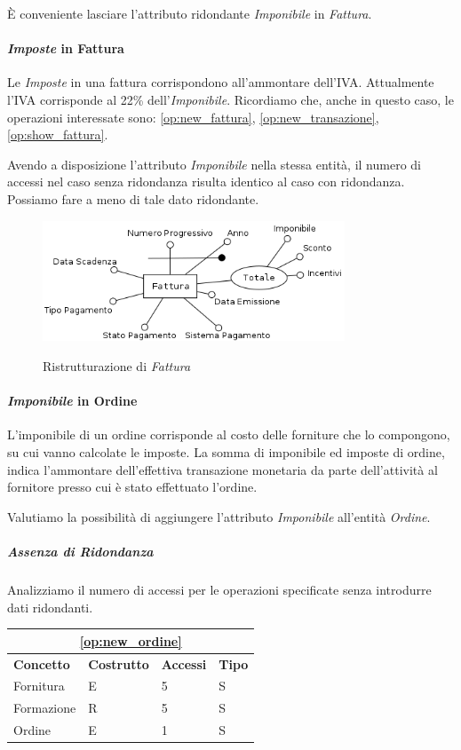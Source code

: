 					È conveniente lasciare l'attributo ridondante \emph{Imponibile} in \emph{Fattura}.

			\paragraph{\emph{Imposte} in Fattura}
				Le \emph{Imposte} in una fattura corrispondono all'ammontare dell'IVA. Attualmente l'IVA corrisponde al 22\% dell'\emph{Imponibile}. Ricordiamo che, anche in questo caso, le operazioni interessate sono: \ref{op:new_fattura}, \ref{op:new_transazione}, \ref{op:show_fattura}.

				Avendo a disposizione l'attributo \emph{Imponibile} nella stessa entità, il numero di accessi nel caso senza ridondanza risulta identico al caso con ridondanza. Possiamo fare a meno di tale dato ridondante.

				\begin{figure}[H]
					\includegraphics[width=9cm]{images/refactor/fattura.png}
					\centering
					\label{fig:fattura_refactor}
					\caption{Ristrutturazione di \emph{Fattura}}
				\end{figure}

			\paragraph{\emph{Imponibile} in Ordine}
				L'imponibile di un ordine corrisponde al costo delle forniture che lo compongono, su cui vanno calcolate le imposte. La somma di imponibile ed imposte di ordine, indica l'ammontare dell'effettiva transazione monetaria da parte dell'attività al fornitore presso cui è stato effettuato l'ordine.

				Valutiamo la possibilità di aggiungere l'attributo \emph{Imponibile} all'entità \emph{Ordine}.

				\subparagraph{Assenza di Ridondanza}
					Analizziamo il numero di accessi per le operazioni specificate senza introdurre dati ridondanti.

					\vspace{2ex}
					\begin{tabular}{| p{3cm} | p{3cm} | p{3cm} | p{3cm} |}
						\hline
						\multicolumn{4}{|c|}{\textbf{\ref{op:new_ordine}}} \\ \hline
						\textbf{Concetto} & \textbf{Costrutto} & \textbf{Accessi} & \textbf{Tipo} \\ \hline
						Fornitura 	& E & 5 & S \\
						Formazione 	& R & 5 & S \\
						Ordine 		& E & 1 & S \\
						\hline
					\end{tabular}

